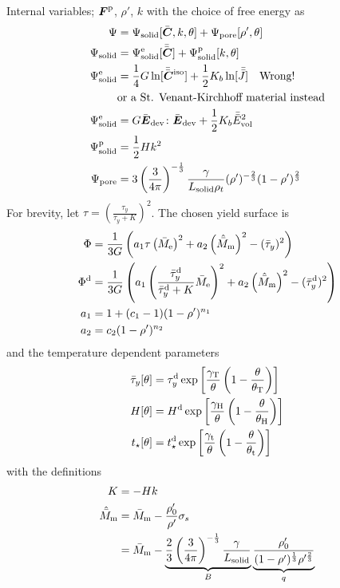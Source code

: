 \documentclass[a4paper,11pt]{article}
\newcommand{\ts}[1]{\text{\boldmath $#1$}}
\newcommand{\dev}{{\rm dev}}
\newcommand{\vol}{{\rm vol}}
\newcommand{\rmd}{{\rm d}}
\newcommand{\rme}{{\rm e}}
\newcommand{\rmm}{{\rm m}}
\newcommand{\rmp}{{\rm p}}
\newcommand{\rmT}{{\rm T}}
\newcommand{\rmH}{{\rm H}}
\newcommand{\rmt}{{\rm t}}
\begin{document}
Internal variables; $\ts F^\rmp$, $\rho'$, $k$ with the choice of free energy as
\begin{align*}
	\Psi &= \Psi_{\rm solid}[\bar{\ts C},k,\theta] + \Psi_{\rm pore}[\rho',\theta]\\
	\Psi_{\rm solid} &= \Psi_{\rm solid}^\rme[\bar{\bar{\ts C}}] + \Psi_{\rm solid}^\rmp[k,\theta]\\
	\Psi_{\rm solid}^\rme &=  \frac14 G \ln[\bar{\bar{\ts C}}^{\rm iso}] + \frac12 K_b\ln[\bar{\bar J}] \text{\quad Wrong!}\\
	&\text{or a St. Venant-Kirchhoff material instead}\\
	\Psi_{\rm solid}^\rme &=  G \bar{\ts E}_\dev\colon\bar{\ts E}_\dev + \frac12 K_b \bar{\bar{E}}_\vol^2\\
	\Psi_{\rm solid}^\rmp &= \frac12 H k^2\\
	\Psi_{\rm pore} &= 3\left(\frac{3}{4\pi}\right)^{-\frac13} \frac{\gamma}{L_{\rm solid}\rho_t}(\rho')^{-\frac23}(1-\rho')^{\frac23}
\end{align*}
For brevity, let $\tau = \left(\frac{\tau_y}{\tau_y+K}\right)^2$.
The chosen yield surface is
\begin{align*}
	\Phi &=\frac{1}{3G} \left(a_1 \tau\left(\bar{M}_\rme\right)^2 + a_2\left(\hat{\bar M}_\rmm\right)^2 - (\bar\tau_y)^2\right)\\
	\Phi^\rmd &=\frac{1}{3G} \left(a_1 \left(\frac{\bar\tau_y^\rmd}{\bar\tau_y^\rmd+K}\bar{M}_\rme\right)^2 + a_2\left(\hat{\bar M}_\rmm\right)^2 - (\bar\tau_y^\rmd)^2\right)\\
	a_1 &= 1+(c_1-1)(1-\rho')^{n_1}\\
	a_2 &= c_2(1-\rho')^{n_2}
\end{align*}
and the temperature dependent parameters
\begin{align*}
	\bar\tau_y[\theta] &= \tau_y^\rmd \exp\left[\frac{\gamma_\rmT}{\theta}\left(1-\frac{\theta}{\theta_\rmT}\right)\right]\\
	H[\theta] &= H^\rmd \exp\left[\frac{\gamma_\rmH}{\theta}\left(1-\frac{\theta}{\theta_\rmH}\right)\right]\\
	t_\star[\theta] &= t_\star^\rmd \exp\left[\frac{\gamma_\rmt}{\theta}\left(1-\frac{\theta}{\theta_\rmt}\right)\right]
\end{align*}
with the definitions 
\begin{align*}
	K &= -H k\\
	\hat{\bar M}_\rmm &= \bar M_\rmm - \frac{\rho_0'}{\rho'}\sigma_s \\
	&= \bar M_\rmm - \underbrace{\frac23\left(\frac{3}{4\pi}\right)^{-\frac13} \frac{\gamma}{L_{\rm solid}}}_{B}\underbrace{\frac{\rho_0'}{(1-\rho')^{\frac13}\rho'^{\frac23}}}_{q}
\end{align*}
\end{document}
